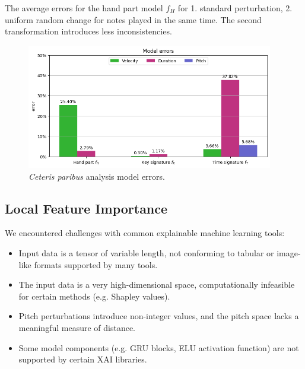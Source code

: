 \begin{table}[ht!]

\caption[The average errors for the hand part model]{The average errors for the hand part model $f_H$ for 1. standard perturbation, 2. uniform random change for notes played in the same time. The second transformation introduces less inconsistencies.}
\label{hand_part_perturbations}
\end{table} 

\begin{figure}[!ht]
\centering
\includegraphics[width=0.96\textwidth]{images/ceteris_paribus_results.png}
\caption[\emph{Ceteris paribus} analysis model errors]{\emph{Ceteris paribus} analysis model errors.}
\label{ceteris_paribus}
\end{figure}

\subsection{Local Feature Importance}

We encountered challenges with common explainable machine learning tools: 

\begin{itemize}[noitemsep, topsep=4pt]
	\item Input data is a tensor of variable length, not conforming to tabular or image-like formats supported by many tools.
	\item The input data is a very high-dimensional space, computationally infeasible for certain methods (e.g. Shapley values).
	\item Pitch perturbations introduce non-integer values, and the pitch space lacks a meaningful measure of distance.
	\item Some model components (e.g. GRU blocks, ELU activation function) are not supported by certain XAI libraries.
\end{itemize} 

